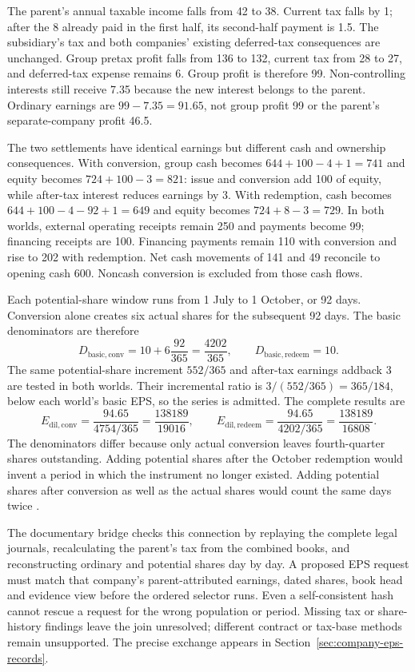 The parent's annual taxable income falls from 42 to 38. Current tax falls by 1;
after the 8 already paid in the first half, its second-half payment is 1.5.
The subsidiary's tax and both companies' existing deferred-tax consequences
are unchanged. Group pretax profit falls from 136 to 132, current tax from 28
to 27, and deferred-tax expense remains 6. Group profit is therefore 99.
Non-controlling interests still receive 7.35 because the new interest belongs
to the parent. Ordinary earnings are $99-7.35=91.65$, not group profit 99
or the parent's separate-company profit 46.5.

The two settlements have identical earnings but different cash and ownership
consequences. With conversion, group cash becomes $644+100-4+1=741$ and equity
becomes $724+100-3=821$: issue and conversion add 100 of equity, while after-tax
interest reduces earnings by 3. With redemption, cash becomes
$644+100-4-92+1=649$ and equity becomes $724+8-3=729$.
In both worlds, external operating receipts remain 250 and payments become 99;
financing receipts are 100. Financing payments remain 110 with conversion and
rise to 202 with redemption. Net cash movements of 141 and 49 reconcile to
opening cash 600. Noncash conversion is excluded from those cash flows.

Each potential-share window runs from 1 July to 1 October, or 92 days.
Conversion alone creates six actual shares for the subsequent 92 days.
The basic denominators are therefore
\[
 D_{\mathrm{basic,conv}}=10+6\frac{92}{365}=\frac{4202}{365},
 \qquad D_{\mathrm{basic,redeem}}=10.
\]
The same potential-share increment $552/365$ and after-tax earnings addback 3
are tested in both worlds. Their incremental ratio is
$3/(552/365)=365/184$, below each world's basic EPS, so the series is admitted.
The complete results are
\[
 E_{\mathrm{dil,conv}}=\frac{94.65}{4754/365}
     =\frac{138189}{19016},\qquad
 E_{\mathrm{dil,redeem}}=\frac{94.65}{4202/365}
     =\frac{138189}{16808}.
\]
The denominators differ because only actual conversion leaves fourth-quarter
shares outstanding. Adding potential shares after the October redemption
would invent a period in which the instrument no longer existed. Adding
potential shares after conversion as well as the actual shares would count
the same days twice \citep[IAS~33, paragraphs 21(c), 33--38]{eu20231803}.

The documentary  bridge checks this connection by
replaying the complete legal journals, recalculating the parent's tax from
the combined books, and reconstructing ordinary and potential shares day by
day. A proposed EPS request must match that company's parent-attributed
earnings, dated shares, book head and evidence view before the ordered selector
runs. Even a self-consistent hash cannot rescue a request for the wrong
population or period. Missing tax or share-history findings leave the join
unresolved; different contract or tax-base methods remain unsupported.
The precise exchange appears in Section~\ref{sec:company-eps-records}.
